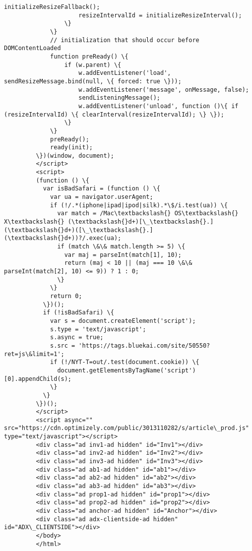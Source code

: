 \documentclass[11pt]{article}
\begin{document}
\begin{Verbatim}[commandchars=\\\{\}]
                     initializeResizeFallback();
                     resizeIntervalId = initializeResizeInterval();
                 \}
             \}
             // initialization that should occur before DOMContentLoaded
             function preReady() \{
                 if (w.parent) \{
                     w.addEventListener('load', sendResizeMessage.bind(null, \{ forced: true \}));
                     w.addEventListener('message', onMessage, false);
                     sendListeningMessage();
                     w.addEventListener('unload', function ()\{ if (resizeIntervalId) \{ clearInterval(resizeIntervalId); \} \});
                 \}
             \}
             preReady();
             ready(init);
         \})(window, document);
         </script>
         <script>
         (function () \{
           var isBadSafari = (function () \{
             var ua = navigator.userAgent;
             if (!/.*(iphone|ipad|ipod|silk).*\$/i.test(ua)) \{
               var match = /Mac\textbackslash{} OS\textbackslash{} X\textbackslash{} (\textbackslash{}d+)[\_\textbackslash{}.](\textbackslash{}d+)([\_\textbackslash{}.](\textbackslash{}d+))?/.exec(ua);
               if (match \&\& match.length >= 5) \{
                 var maj = parseInt(match[1], 10);
                 return (maj < 10 || (maj === 10 \&\& parseInt(match[2], 10) <= 9)) ? 1 : 0;
               \}
             \}
             return 0;
           \})();
           if (!isBadSafari) \{
             var s = document.createElement('script');
             s.type = 'text/javascript';
             s.async = true;
             s.src = 'https://tags.bluekai.com/site/50550?ret=js\&limit=1';
             if (!/NYT-T=out/.test(document.cookie)) \{
               document.getElementsByTagName('script')[0].appendChild(s);
             \}
           \}
         \})();
         </script>
         <script async="" src="https://cdn.optimizely.com/public/3013110282/s/article\_prod.js" type="text/javascript"></script>
         <div class="ad inv1-ad hidden" id="Inv1"></div>
         <div class="ad inv2-ad hidden" id="Inv2"></div>
         <div class="ad inv3-ad hidden" id="Inv3"></div>
         <div class="ad ab1-ad hidden" id="ab1"></div>
         <div class="ad ab2-ad hidden" id="ab2"></div>
         <div class="ad ab3-ad hidden" id="ab3"></div>
         <div class="ad prop1-ad hidden" id="prop1"></div>
         <div class="ad prop2-ad hidden" id="prop2"></div>
         <div class="ad anchor-ad hidden" id="Anchor"></div>
         <div class="ad adx-clientside-ad hidden" id="ADX\_CLIENTSIDE"></div>
         </body>
         </html>
\end{Verbatim}
            
\end{document}
